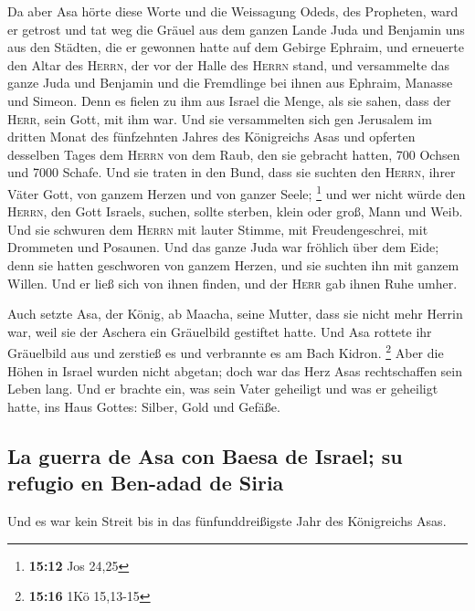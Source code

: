  Da aber Asa hörte diese Worte und die Weissagung Odeds,
des Propheten, ward er getrost und tat weg die Gräuel aus dem ganzen
Lande Juda und Benjamin uns aus den Städten, die er gewonnen hatte auf
dem Gebirge Ephraim, und erneuerte den Altar des \textsc{Herrn}, der vor
der Halle des \textsc{Herrn} stand,  und versammelte das
ganze Juda und Benjamin und die Fremdlinge bei ihnen aus Ephraim,
Manasse und Simeon. Denn es fielen zu ihm aus Israel die Menge, als sie
sahen, dass der \textsc{Herr}, sein Gott, mit ihm war. 
Und sie versammelten sich gen Jerusalem im dritten Monat des fünfzehnten
Jahres des Königreichs Asas  und opferten desselben Tages
dem \textsc{Herrn} von dem Raub, den sie gebracht hatten, 700 Ochsen und
7000 Schafe.  Und sie traten in den Bund, dass sie
suchten den \textsc{Herrn}, ihrer Väter Gott, von ganzem Herzen und von
ganzer Seele; \footnote{\textbf{15:12} Jos 24,25}  und
wer nicht würde den \textsc{Herrn}, den Gott Israels, suchen, sollte
sterben, klein oder groß, Mann und Weib.  Und sie
schwuren dem \textsc{Herrn} mit lauter Stimme, mit Freudengeschrei, mit
Drommeten und Posaunen.  Und das ganze Juda war fröhlich
über dem Eide; denn sie hatten geschworen von ganzem Herzen, und sie
suchten ihn mit ganzem Willen. Und er ließ sich von ihnen finden, und
der \textsc{Herr} gab ihnen Ruhe umher.

 Auch setzte Asa, der König, ab Maacha, seine Mutter,
dass sie nicht mehr Herrin war, weil sie der Aschera ein Gräuelbild
gestiftet hatte. Und Asa rottete ihr Gräuelbild aus und zerstieß es und
verbrannte es am Bach Kidron. \footnote{\textbf{15:16} 1Kö 15,13-15}
 Aber die Höhen in Israel wurden nicht abgetan; doch war
das Herz Asas rechtschaffen sein Leben lang.  Und er
brachte ein, was sein Vater geheiligt und was er geheiligt hatte, ins
Haus Gottes: Silber, Gold und Gefäße.

\hypertarget{la-guerra-de-asa-con-baesa-de-israel-su-refugio-en-ben-adad-de-siria}{%
\subsection{La guerra de Asa con Baesa de Israel; su refugio en Ben-adad
de
Siria}\label{la-guerra-de-asa-con-baesa-de-israel-su-refugio-en-ben-adad-de-siria}}

 Und es war kein Streit bis in das fünfunddreißigste Jahr
des Königreichs Asas.


